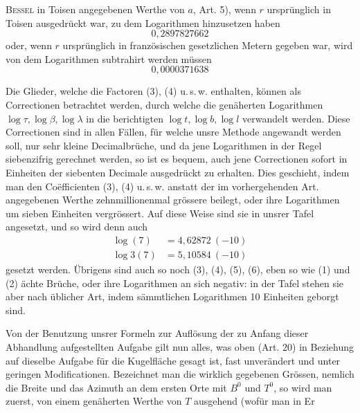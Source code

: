 %
\textsc{Bessel} in Toisen angegebenen Werthe von \(a\), Art. 5), wenn \(r\) ursprünglich in Toisen ausgedrückt war, zu dem Logarithmen hinzusetzen haben
\[
0{,}2897827662
\]
oder, wenn \(r\) ursprünglich in französischen gesetzlichen Metern gegeben war, wird von dem Logarithmen subtrahirt werden müssen
\[
0{,}0000371638
\]

Die Glieder, welche die Factoren (3), (4) u.\,s.\,w. enthalten, können als Correctionen betrachtet werden, durch welche die genäherten Logarithmen \(\log\tau,\log\beta,\log\lambda\) in die berichtigten \(\log t,\log b,\log l\) verwandelt werden. Diese Correctionen sind in allen Fällen, für welche unsre Methode angewandt werden soll, nur sehr kleine Decimalbrüche, und da jene Logarithmen in der Regel siebenzifrig gerechnet werden, so ist es bequem, auch jene Correctionen sofort in Einheiten der siebenten Decimale ausgedrückt zu erhalten. Dies geschieht, indem man den Coëfficienten (3), (4) u.\,s.\,w. anstatt der im vorhergehenden Art. angegebenen Werthe zehnmillionenmal grössere beilegt, oder ihre Logarithmen um sieben Einheiten vergrössert. Auf diese Weise sind sie in unsrer Tafel angesetzt, und so wird denn auch
\[
\begin{aligned}
\log(7)&=4{,}62872\ (-10)\\
\log3(7)&=5{,}10584\ (-10)
\end{aligned}
\]
gesetzt werden. Übrigens sind auch so noch (3), (4), (5), (6), eben so wie (1) und (2) ächte Brüche, oder ihre Logarithmen an sich negativ: in der Tafel stehen sie aber nach üblicher Art, indem sämmtlichen Logarithmen 10 Einheiten geborgt sind.

Von der Benutzung unsrer Formeln zur Auflösung der zu Anfang dieser Abhandlung aufgestellten Aufgabe gilt nun alles, was oben (Art. 20) in Beziehung auf dieselbe Aufgabe für die Kugelfläche gesagt ist, fast unverändert und unter geringen Modificationen. Bezeichnet man die wirklich gegebenen Grössen, nemlich die Breite und das Azimuth an dem ersten Orte mit \(B^0\) und \(T^0\), so wird man zuerst, von einem genäherten Werthe von \(T\) ausgehend (wofür man in Er%
